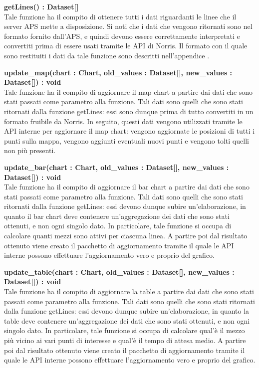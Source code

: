 \begin{description}
            \item \textbf{getLines() : Dataset[]} \\
            Tale funzione ha il compito di ottenere tutti i dati riguardanti le linee che il server APS mette a disposizione. Si noti che i dati che vengono ritornati sono nel formato fornito dall'APS, e quindi devono essere correttamente interpretati e convertiti prima di essere usati tramite le API di Norris. Il formato con il quale sono restituiti i dati da tale funzione sono descritti nell'appendice .
            
            \item \textbf{update\_map(chart : Chart, old\_values : Dataset[], new\_values : Dataset[]) : void} \\
            Tale funzione ha il compito di aggiornare il map chart a partire dai dati che sono stati passati come parametro alla funzione. Tali dati sono quelli che sono stati ritornati dalla funzione getLines: essi sono dunque prima di tutto convertiti in un formato fruibile da Norris. In seguito, questi dati vengono utilizzati tramite le API interne per aggiornare il map chart: vengono aggiornate le posizioni di tutti i punti sulla mappa, vengono aggiunti eventuali nuovi punti e vengono tolti quelli non più presenti.
            
            \item \textbf{update\_bar(chart : Chart, old\_values : Dataset[], new\_values : Dataset[]) : void} \\
            Tale funzione ha il compito di aggiornare il bar chart a partire dai dati che sono stati passati come parametro alla funzione. Tali dati sono quelli che sono stati ritornati dalla funzione getLines: essi devono dunque subire un'elaborazione, in quanto il bar chart deve contenere un'aggregazione dei dati che sono stati ottenuti, e non ogni singolo dato. In particolare, tale funzione si occupa di calcolare quanti mezzi sono attivi per ciascuna linea. A partire poi dal risultato ottenuto viene creato il pacchetto di aggiornamento tramite il quale le API interne possono effettuare l'aggiornamento vero e proprio del grafico.
            
            \item \textbf{update\_table(chart : Chart, old\_values : Dataset[], new\_values : Dataset[]) : void} \\
            Tale funzione ha il compito di aggiornare la table a partire dai dati che sono stati passati come parametro alla funzione. Tali dati sono quelli che sono stati ritornati dalla funzione getLines: essi devono dunque subire un'elaborazione, in quanto la table deve contenere un'aggregazione dei dati che sono stati ottenuti, e non ogni singolo dato. In particolare, tale funzione si occupa di calcolare qual'è il mezzo più vicino ai vari punti di interesse e qual'è il tempo di attesa medio. A partire poi dal risultato ottenuto viene creato il pacchetto di aggiornamento tramite il quale le API interne possono effettuare l'aggiornamento vero e proprio del grafico.

        \end{description}